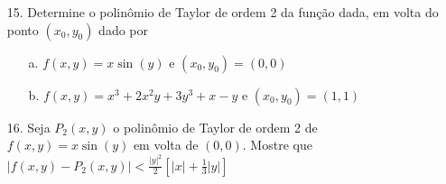 \begin{itemize}
	\item [15.] Determine o polinômio de Taylor de ordem 2 da função dada, em volta do ponto $(x_{0},y_{0})$ dado por 
	\begin{itemize}
		\item[a.] $f(x,y)=x\sin (y)$ e $(x_{0},y_{0})=(0,0)$
		\item[b.] $f(x,y)=x^{3}+2x^{2}y+3y^{3}+x-y$ e $(x_{0},y_{0})=(1,1)$
	\end{itemize}
\end{itemize}
\begin{itemize}
	\item [16.] Seja $P_{2}(x,y)$ o polinômio de Taylor de ordem 2 de $f(x,y)=x\sin (y)$ em volta de $(0,0)$. Mostre que $\left|f(x,y)-P_{2}(x,y) \right|<\frac{\left| y\right| ^{2}}{2}\left[\left| x\right| +\frac{1}{3} \left|y \right| \right]  $
\end{itemize}

